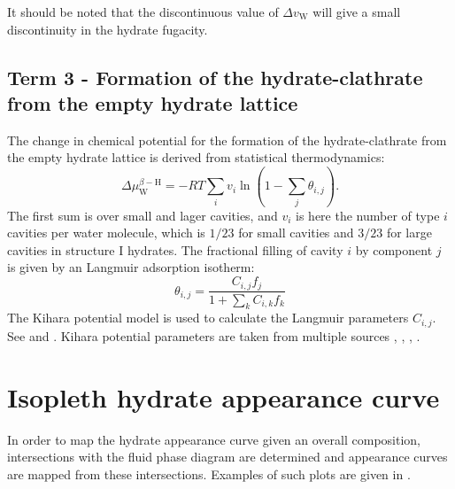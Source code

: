 \documentclass[english]{../thermomemo/thermomemo}
\newcommand{\hyd}{\text{H}}
\newcommand{\wat}{\text{W}}
\begin{document}
It should be noted that the discontinuous value of $\Delta v_\wat$ will
give a small discontinuity in the hydrate fugacity.

\subsection{Term 3 - Formation of the hydrate-clathrate from the empty
  hydrate lattice}
The change in chemical potential for the formation of the
hydrate-clathrate from the empty hydrate lattice is derived from
statistical thermodynamics:
\begin{equation}
  \label{eq:term3}
    \Delta \mu_\wat^{\beta - \hyd} = -RT \underset{i}{\sum}v_i \ln
    \left( 1- \underset{j}{\sum} \theta_{i,j} \right).
\end{equation}
The first sum is over small and lager cavities, and $v_i$ is here the number of
type $i$ cavities per water molecule, which is $1/23$ for small cavities
and $3/23$ for large cavities in structure I hydrates.
The fractional filling of cavity $i$ by component $j$ is given by an
Langmuir adsorption isotherm:
\begin{equation}
  \label{eq:theta}
    \theta_{i,j} = \frac{C_{i,j} f_j}{1 + \underset{k}{\sum} C_{i,k} f_k }
\end{equation}
The Kihara potential model is used to calculate the Langmuir
parameters $C_{i,j}$. See \citet{McKoy1963} and
\citet[Sec. 5.1.4]{Sloan2008}. Kihara potential parameters are taken from
multiple sources \citet{Sloan2008}, \citet{Avlonitis1994a},
\citet{Kalorazi1995}, \citet{Jager2013}.

\section{Isopleth hydrate appearance curve}
In order to map the hydrate appearance curve given an overall
composition, intersections with the fluid phase diagram are determined
and appearance curves are mapped from these intersections. Examples of
such plots are given in
.

\clearpage


\end{document}
